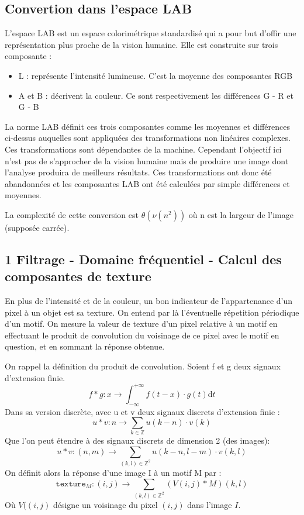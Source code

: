\documentclass{article}
\begin{document}
\begin{multicols}{2}
\subsection{Convertion dans l'espace LAB}

L'espace LAB est un espace colorimétrique standardisé qui a pour but d'offir une représentation plus proche de la vision humaine. Elle est construite sur trois composante :
\begin{itemize}
	\item L : représente l'intensité lumineuse. C'est la moyenne des composantes RGB
	\item A et B : décrivent la couleur. Ce sont respectivement les différences G - R et G - B
\end{itemize}
La norme LAB définit ces trois composantes comme les moyennes et différences ci-dessus auquelles sont appliquées des transformations non linéaires complexes. Ces transformations sont dépendantes de la machine. Cependant l'objectif ici n'est pas de s'approcher de la vision humaine mais de produire une image dont l'analyse produira de meilleurs résultats. Ces transformations ont donc été abandonnées et les composantes LAB ont été calculées par simple différences et moyennes.

La complexité de cette conversion est $\theta(\nu(n^2))$ où n est la largeur de l'image (supposée carrée).

\subsection{1 Filtrage - Domaine fréquentiel - Calcul des composantes de texture}

En plus de l'intensité et de la couleur, un bon indicateur de l'appartenance d'un pixel à un objet est sa texture. On entend par là l'éventuelle répetition périodique d'un motif. On mesure la valeur de texture d'un pixel relative à un motif en effectuant le produit de convolution du voisinage de ce pixel avec le motif en question, et en sommant la réponse obtenue.

On rappel la définition du produit de convolution. 
Soient f et g deux signaux d'extension finie.
$$ f * g : x \rightarrow \int_{-\infty}^{+\infty} f(t-x) \cdot g(t) \mathrm dt $$
Dans sa version discrète, avec u et v deux signaux discrets d'extension finie :
$$ u * v : n \rightarrow \sum_{k \in \mathbb{Z}} u(k -n) \cdot v(k)$$
Que l'on peut étendre à des signaux discrets de dimension 2 (des images):
$$ u * v : (n, m) \rightarrow \sum_{(k,l) \in \mathbb{Z}^2} u(k - n, l - m) \cdot v(k, l)$$
On définit alors la réponse d'une image I à un motif M par :
$$\mathtt{texture}_M : (i, j) \rightarrow \sum_{(k,l) \in \mathbb{Z}^2} (V(i, j) * M)(k, l)$$
Où $V((i, j)$ désigne un voisinage du pixel $(i, j)$ dans l'image $I$.


\end{multicols}
\end{document}
